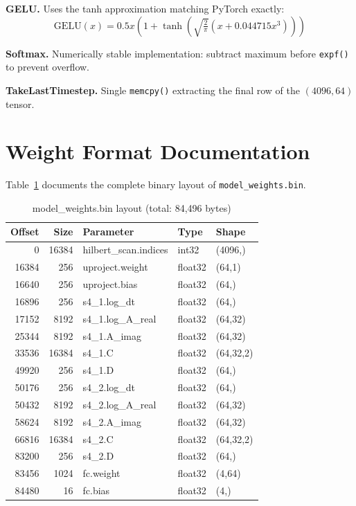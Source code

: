 \documentclass[conference]{IEEEtran}
\begin{document}
\textbf{GELU.} Uses the tanh approximation matching PyTorch exactly:
\begin{equation}
\text{GELU}(x) = 0.5x\!\left(1 + \tanh\!\left(\sqrt{\tfrac{2}{\pi}}\left(x + 0.044715x^3\right)\right)\right)
\end{equation}

\textbf{Softmax.} Numerically stable implementation: subtract maximum before
\texttt{expf()} to prevent overflow.

\textbf{TakeLastTimestep.} Single \texttt{memcpy()} extracting the final row
of the $(4096,64)$ tensor.

\section{Weight Format Documentation}
Table~\ref{tab:weights} documents the complete binary layout of
\texttt{model\_weights.bin}.

\begin{table}[h]
\centering
\caption{model\_weights.bin layout (total: 84,496 bytes)}
\label{tab:weights}
\begin{tabular}{@{}rrlll@{}}
\toprule
Offset & Size & Parameter & Type & Shape \\
\midrule
0       & 16384 & hilbert\_scan.indices & int32   & (4096,) \\
16384   & 256   & uproject.weight       & float32 & (64,1) \\
16640   & 256   & uproject.bias         & float32 & (64,) \\
16896   & 256   & s4\_1.log\_dt          & float32 & (64,) \\
17152   & 8192  & s4\_1.log\_A\_real      & float32 & (64,32) \\
25344   & 8192  & s4\_1.A\_imag           & float32 & (64,32) \\
33536   & 16384 & s4\_1.C               & float32 & (64,32,2) \\
49920   & 256   & s4\_1.D               & float32 & (64,) \\
50176   & 256   & s4\_2.log\_dt          & float32 & (64,) \\
50432   & 8192  & s4\_2.log\_A\_real      & float32 & (64,32) \\
58624   & 8192  & s4\_2.A\_imag           & float32 & (64,32) \\
66816   & 16384 & s4\_2.C               & float32 & (64,32,2) \\
83200   & 256   & s4\_2.D               & float32 & (64,) \\
83456   & 1024  & fc.weight             & float32 & (4,64) \\
84480   & 16    & fc.bias               & float32 & (4,) \\
\bottomrule
\end{tabular}
\end{table}
\end{document}
